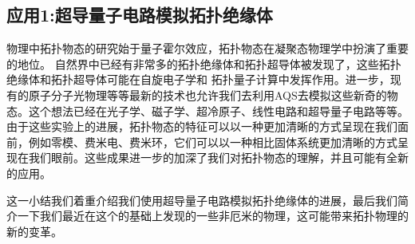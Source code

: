 \documentclass[supercite]{HustGraduPaper}
\begin{document}
   
   \subsection{应用1:超导量子电路模拟拓扑绝缘体}
  物理中拓扑物态的研究始于量子霍尔效应\cite{laughlin1981quantized}，拓扑物态在凝聚态物理学中扮演了重要的地位\cite{RevModPhys.83.1057}。 自然界中已经有非常多的拓扑绝缘体\cite{fu2007topological}和拓扑超导体被发现了\cite{Ando2013topological,ando2015topological,yuan2014generation}，这些拓扑绝缘体和拓扑超导体可能在自旋电子学\cite{murakami2003dissipationless,koralek2009emergence}和
  拓扑量子计算中发挥作用\cite{sau2010generic,Laughlin1983}。进一步，现有的原子分子光物理等等最新的技术也允许我们去利用AQS去模拟这些新奇的物态。这个想法已经在光子学\cite{khanikaev2013photonic,ozawa2018topological,schomerus2013parity,yang2018ideal,cheng2016robust}、磁子学\cite{zhang2013topological,mochizuki2014thermally}、超冷原子\cite{Goldman2010,Grusdt2014,Goldman2014,aidelsburger2011experimental,Zhai2015,Wang2010}、线性电路\cite{Whittaker2018,Ningyuan2015,Zhu2018}和超导量子电路\cite{Ashhab2014}等等\cite{Sala2015a}。由于这些实验上的进展，拓扑物态的特征可以以一种更加清晰的方式呈现在我们面前，例如零模、费米电、费米环，它们可以以一种相比固体系统更加清晰的方式呈现在我们眼前\cite{hsieh2009observation,imhof2018topolectrical,Wu2006}。这些成果进一步的加深了我们对拓扑物态的理解，并且可能有全新的应用\cite{aidelsburger2015measuring}。
  
  这一小结我们着重介绍我们使用超导量子电路模拟拓扑绝缘体的进展，最后我们简介一下我们最近在这个的基础上发现的一些非厄米的物理，这可能带来拓扑物理的新的变革。
  
\end{document}
